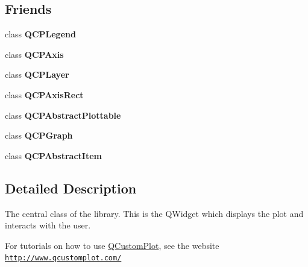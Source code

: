 \subsection*{Friends}
\begin{DoxyCompactItemize}
\item 
class {\bfseries Q\+C\+P\+Legend}\hypertarget{class_q_custom_plot_a6dddb88f268bc26693c552bbb68acbb5}{}\label{class_q_custom_plot_a6dddb88f268bc26693c552bbb68acbb5}

\item 
class {\bfseries Q\+C\+P\+Axis}\hypertarget{class_q_custom_plot_a1f3cf57518867648e4f239eb18977a44}{}\label{class_q_custom_plot_a1f3cf57518867648e4f239eb18977a44}

\item 
class {\bfseries Q\+C\+P\+Layer}\hypertarget{class_q_custom_plot_a2a01236a783f727a2d74f0dcb7ffa34a}{}\label{class_q_custom_plot_a2a01236a783f727a2d74f0dcb7ffa34a}

\item 
class {\bfseries Q\+C\+P\+Axis\+Rect}\hypertarget{class_q_custom_plot_a34deb2f894a2e4188ca024f20ccbefc1}{}\label{class_q_custom_plot_a34deb2f894a2e4188ca024f20ccbefc1}

\item 
class {\bfseries Q\+C\+P\+Abstract\+Plottable}\hypertarget{class_q_custom_plot_ab986d82221cf19fcfdc2833494186c03}{}\label{class_q_custom_plot_ab986d82221cf19fcfdc2833494186c03}

\item 
class {\bfseries Q\+C\+P\+Graph}\hypertarget{class_q_custom_plot_a449c97cfecc15225066e1eaf930433c1}{}\label{class_q_custom_plot_a449c97cfecc15225066e1eaf930433c1}

\item 
class {\bfseries Q\+C\+P\+Abstract\+Item}\hypertarget{class_q_custom_plot_a622b388d2330e0c3bc23de59fbd4e227}{}\label{class_q_custom_plot_a622b388d2330e0c3bc23de59fbd4e227}

\end{DoxyCompactItemize}


\subsection{Detailed Description}
The central class of the library. This is the Q\+Widget which displays the plot and interacts with the user. 

For tutorials on how to use \hyperlink{class_q_custom_plot}{Q\+Custom\+Plot}, see the website~\newline
\href{http://www.qcustomplot.com/}{\tt http\+://www.\+qcustomplot.\+com/} 

